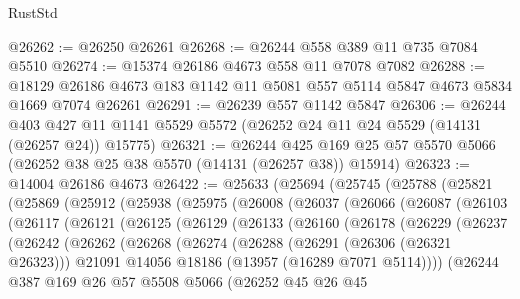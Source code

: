 \begin{lexlean}{RustStd}
\begin{coremodule}
@26262 := @26250 @26261
@26268 := @26244 @558 @389 @11 @735 @7084 @5510
@26274 := @15374 @26186 @4673 @558 @11 @7078 @7082
@26288 := @18129 @26186 @4673 @183 @1142 @11 @5081 @557 @5114 @5847 @4673 @5834 @1669 @7074 @26261
@26291 := @26239 @557 @1142 @5847
@26306 := @26244
    @403
    @427
    @11
    @1141
    @5529
    @5572
    (@26252 @24 @11 @24 @5529 (@14131 (@26257 @24)) @15775)
@26321 := @26244
    @425
    @169
    @25
    @57
    @5570
    @5066
    (@26252 @38 @25 @38 @5570 (@14131 (@26257 @38)) @15914)
@26323 := @14004 @26186 @4673
@26422 := @25633
    (@25694
      (@25745
        (@25788
          (@25821
            (@25869
              (@25912
                (@25938
                  (@25975
                    (@26008
                      (@26037
                        (@26066
                          (@26087
                            (@26103
                              (@26117
                                (@26121
                                  (@26125
                                    (@26129
                                      (@26133
                                        (@26160
                                          (@26178
                                            (@26229
                                              (@26237
                                                (@26242
                                                  (@26262
                                                    (@26268
                                                      (@26274
                                                        (@26288
                                                          (@26291 (@26306 (@26321 @26323)))
                                                          @21091
                                                          @14056
                                                          @18186
                                                          (@13957 (@16289 @7071 @5114))))
                                                      (@26244
                                                        @387
                                                        @169
                                                        @26
                                                        @57
                                                        @5508
                                                        @5066
                                                        (@26252
                                                          @45
                                                          @26
                                                          @45

\end{coremodule}
\end{lexlean}
